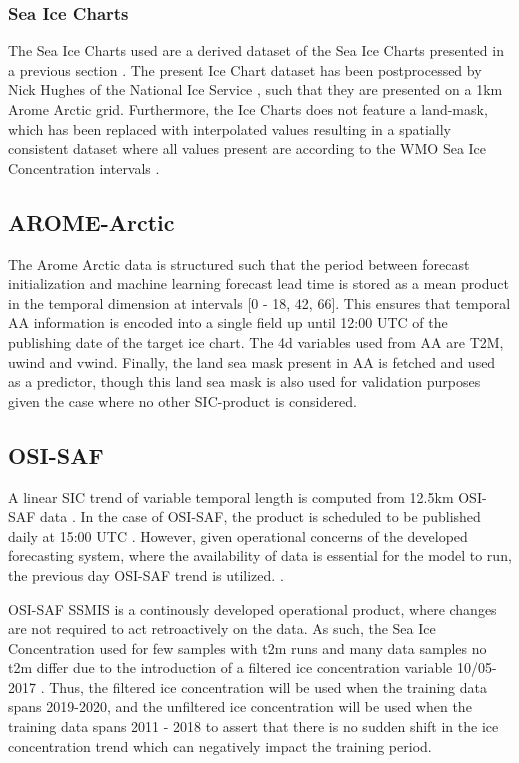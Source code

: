 \documentclass[../main/thesis.tex]{subfiles}
\begin{document}
\subsubsection{Sea Ice Charts}
The Sea Ice Charts used are a derived dataset of the Sea Ice Charts presented in a previous section . The present Ice Chart dataset has been postprocessed by Nick Hughes of the National Ice Service , such that they are presented on a 1km Arome Arctic grid. Furthermore, the Ice Charts does not feature a land-mask, which has been replaced with interpolated values resulting in a spatially consistent dataset where all values present are according to the WMO Sea Ice Concentration intervals \cite{JETSI2014}. 

\subsection{AROME-Arctic}
The Arome Arctic data is structured such that the period between forecast initialization and machine learning forecast lead time is stored as a mean product in the temporal dimension at intervals [0 - 18, 42, 66]. This ensures that temporal AA information is encoded into a single field up until 12:00 UTC of the publishing date of the target ice chart. The 4d variables used from AA are T2M, uwind and vwind. Finally, the land sea mask present in AA is fetched and used as a predictor, though this land sea mask is also used for validation purposes given the case where no other SIC-product is considered.

\subsection{OSI-SAF}
A linear SIC trend of variable temporal length is computed from 12.5km OSI-SAF data . In the case of OSI-SAF, the product is scheduled to be published daily at 15:00 UTC . However, given operational concerns of the developed forecasting system, where the availability of data is essential for the model to run, the previous day OSI-SAF trend is utilized. .

OSI-SAF SSMIS is a continously developed operational product, where changes are not required to act retroactively on the data. As such, the Sea Ice Concentration used for few samples with t2m runs and many data samples no t2m differ due to the introduction of a filtered ice concentration variable 10/05-2017 \cite{Tonboe2017}. Thus, the filtered ice concentration will be used when the training data spans 2019-2020, and the unfiltered ice concentration will be used when the training data spans 2011 - 2018 to assert that there is no sudden shift in the ice concentration trend which can negatively impact the training period.



\biblio
\end{document}
